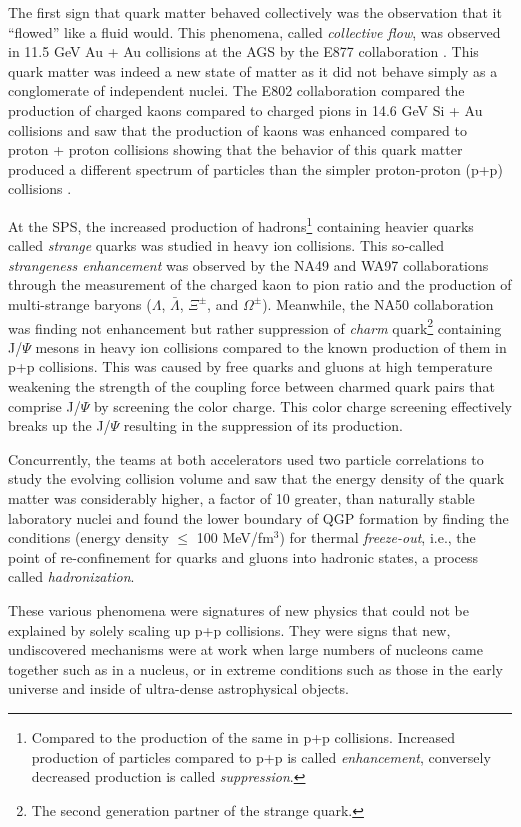 The first sign that quark matter behaved collectively was the observation that it ``flowed'' like a fluid would. This phenomena, called \textit{collective flow}, was observed in 11.5 GeV Au + Au collisions at the AGS by the E877 collaboration \citep{Barrette:1999rx}. This quark matter was indeed a new state of matter as it did not behave simply as a conglomerate of independent nuclei. The E802 collaboration compared the production of charged kaons compared to charged pions in 14.6 GeV Si + Au collisions and saw that the production of kaons was enhanced compared to proton + proton collisions showing that the behavior of this quark matter produced a different spectrum of particles than the simpler proton-proton (p+p) collisions \citep{PhysRevLett.64.847}. 

At the SPS, the increased production of hadrons\footnote{Compared to the production of the same in p+p collisions. Increased production of particles compared to p+p is called \textit{enhancement}, conversely decreased production is called \textit{suppression}.} containing heavier quarks called \textit{strange} quarks was studied in heavy ion collisions. This so-called \textit{strangeness enhancement} was observed by the NA49\citep{Hohne:1999jf} and WA97 collaborations through the measurement of the charged kaon to pion ratio and the production of multi-strange baryons ($\Lambda$, $\bar{\Lambda}$, $\Xi^{\pm}$, and $\Omega^{\pm}$). Meanwhile, the NA50 collaboration was finding not enhancement but rather suppression of \textit{charm} quark\footnote{The second generation partner of the strange quark.} containing J/$\Psi$ mesons in heavy ion collisions compared to the known production of them in p+p collisions\citep{Abreu:2000ni}. This was caused by free quarks and gluons at high temperature weakening the strength of the coupling force between charmed quark pairs that comprise J/$\Psi$ by screening the color charge. This color charge screening effectively breaks up the J/$\Psi$ resulting in the suppression of its production.

Concurrently, the teams at both accelerators used two particle correlations to study the evolving collision volume and saw that the energy density of the quark matter was considerably higher, a factor of 10 greater, than naturally stable laboratory nuclei \citep{Heinz:1999rw} and found the lower boundary of QGP formation by finding the conditions (energy density $\leq$ 100 MeV/fm$^{3}$) for thermal \textit{freeze-out}\citep{BraunMunzinger:1998cg}, i.e., the point of re-confinement for quarks and gluons into hadronic states, a process called \textit{hadronization}.

These various phenomena were signatures of new physics that could not be explained by solely scaling up p+p collisions. They were signs that new, undiscovered mechanisms were at work when large numbers of nucleons came together such as in a nucleus, or in extreme conditions such as those in the early universe and inside of ultra-dense astrophysical objects. 
\pagebreak
\pagebreak
